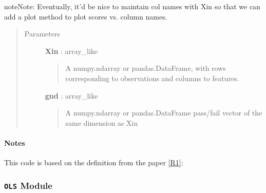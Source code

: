 \documentclass[letterpaper,10pt,english]{sphinxmanual}
\begin{document}
\begin{fulllineitems}
\begin{fulllineitems}
\begin{notice}{note}{Note:}
Eventually, it'd be nice to maintain col names with Xin so that we can add a plot method to plot scores vs. column names.
\end{notice}
\begin{quote}\begin{description}
\item[{Parameters }] \leavevmode
\textbf{Xin} : array\_like
\begin{quote}

A numpy.ndarray or pandas.DataFrame, with rows corresponding to observations and columns to features.
\end{quote}

\textbf{gnd} : array\_like
\begin{quote}

A numpy.ndarray or pandas.DataFrame pass/fail vector of the same dimension as Xin
\end{quote}

\end{description}\end{quote}
\paragraph{Notes}

This code is based on the definition from the paper {\hyperref[qikify.controllers:r1]{{[}R1{]}}}:

\end{fulllineitems}


\begin{fulllineitems}
\label{qikify.controllers:qikify.controllers.LSFS.LSFS.threshold}
\end{fulllineitems}


\end{fulllineitems}



\subsubsection{\texttt{OLS} Module}
\label{qikify.controllers:module-qikify.controllers.OLS}\label{qikify.controllers:ols-module}
\end{document}

